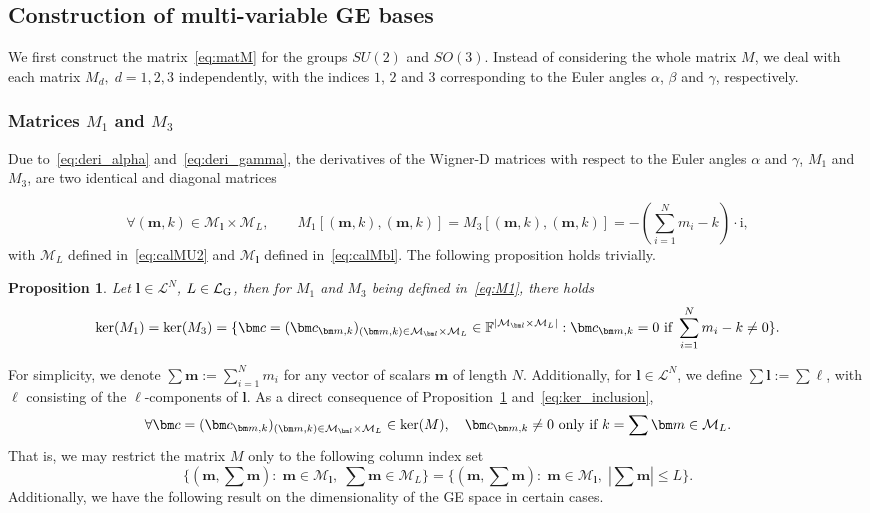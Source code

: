 \documentclass{article}
\newcommand{\dd}{{d}}
\newcommand{\card}[1]{|{#1}|}
\newtheorem{proposition}[theorem]{Proposition}
\numberwithin{equation}{section}
\def\F{\mathbb{F}}
\def\bc{{\bm c}}
\def\bl{{\bm l}}
\def\bbm{{\bm m}}
\def\calM{\mathcal{M}}
\def\calL{\mathcal{L}}
\def\calLG{\mathcal{\calL_{\rm G}}}
\def\MlL{{M}}
\def\Nat{{N}}
\begin{document}
{\subsection{Construction of multi-variable GE bases}

We first construct the matrix~\eqref{eq:matM} for the groups $SU(2)$ and $SO(3)$.
Instead of considering the whole matrix $\MlL$, we deal with each matrix $M_\dd,\; d=1,2,3$ independently, with the indices $1$, $2$ and $3$ corresponding to the Euler angles $\alpha$, $\beta$ and $\gamma$, respectively.

\subsubsection{Matrices $\MlL_1$ and $\MlL_3$}

Due to~\eqref{eq:deri_alpha} and~\eqref{eq:deri_gamma}, the derivatives of the Wigner-D matrices with respect to the Euler angles $\alpha$ and $\gamma$, $\MlL_1$ and $\MlL_3$, are two identical and diagonal matrices 

\begin{equation}
\label{eq:M1}
        \forall (\bbm,k)\in \calM_\bl\times\calM_L, \qquad \MlL_1[(\bbm,k),(\bbm,k)] = \MlL_3[(\bbm,k),(\bbm,k)] = -\left(\sum_{i=1}^N m_i -k\right)\cdot \mathrm{i},
\end{equation}
with $\calM_L$ defined in~\eqref{eq:calMU2} and $\calM_\bl$ defined in~\eqref{eq:calMbl}.
The following proposition holds trivially. 

\begin{proposition}\label{prop:ker-M1-GE}
    Let $\bl\in \calL^N$, $L\in \calLG$, then for $\MlL_1$ and $\MlL_3$ being defined in~\eqref{eq:M1}, there holds
    \[
        \ker(\MlL_1) = \ker(\MlL_3) = \{\bc=(\bc_{\bbm,k})_{(\bbm,k)\in\calM_\bl\times\calM_L}\in\F^{\card{\calM_\bl\times\calM_L}}: \bc_{\bbm,k} = 0 \textup{ if } \sum_{i=1}^N m_i -k \neq 0\}.
    \]
\end{proposition}


For simplicity, we denote $\sum\bbm := \sum_{i=1}^N m_i$ for any vector of scalars $\bbm$ of length $\Nat$. 
Additionally, for $\bl\in \calL^N$, we define $\sum\bl:=\sum\boldsymbol{\ell}$, with
$\boldsymbol{\ell}$ consisting of the $\ell$-components of $\bl$.
As a direct consequence of Proposition~\ref{prop:ker-M1-GE} and~\eqref{eq:ker_inclusion}, 
\begin{equation}\label{eq:kerM-nullpart}
    \forall\bc=(\bc_{\bbm,k})_{(\bbm,k)\in\calM_\bl\times\calM_L}\in\ker(\MlL), \quad \bc_{\bbm,k} \ne 0 \textup{ only if } k=\sum\bbm\in\calM_L.
\end{equation}
That is, we may restrict the matrix $\MlL$ only to the following column index set 
\begin{equation}\label{nonzero-ker}
    \big\{(\bbm,\sum \bbm): \;  \bbm\in\calM_\bl, \; \sum \bbm \in\calM_L\big\} = \Big\{(\bbm,\sum \bbm):\;\bbm\in\calM_\bl, \;|\sum \bbm|\le L\Big\}.
\end{equation}
Additionally, we have the following result on the dimensionality of the GE space in certain cases. 

}
\end{document}
